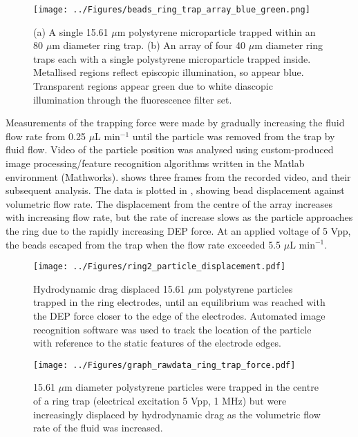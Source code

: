 \begin{figure}
 \centering
 \texttt{[image: ../Figures/beads\_ring\_trap\_array\_blue\_green.png]}
 \caption[Trapping single 15.61 $\mu$m polystyrene microparticles in the ring electrodes.]{(a) A single 15.61 $\mu$m polystyrene microparticle trapped within an 80 $\mu$m diameter ring trap. (b) An array of four 40 $\mu$m diameter ring traps each with a single polystyrene microparticle trapped inside. Metallised regions reflect episcopic illumination, so appear blue. Transparent regions appear green due to white diascopic illumination through the fluorescence filter set.}
 \label{fig:beads_ring_trap_array_blue_green}
\end{figure}

Measurements of the trapping force were made by gradually increasing the fluid flow rate from 0.25 $\mu$L min$^{-1}$ until the particle was removed from the trap by fluid flow. Video of the particle position was analysed using custom-produced image processing/feature recognition algorithms written in the Matlab environment (Mathworks).  shows three frames from the recorded video, and their subsequent analysis. The data is plotted in , showing bead displacement against volumetric flow rate. The displacement from the centre of the array increases with increasing flow rate, but the rate of increase slows as the particle approaches the ring due to the rapidly increasing DEP force. At an applied voltage of 5 Vpp, the beads escaped from the trap when the flow rate exceeded 5.5 $\mu$L min$^{-1}$.

\begin{figure}
 \centering
 \texttt{[image: ../Figures/ring2\_particle\_displacement.pdf]}
 \caption[A single 15.61 $\mu$m polystyrene particle trapped in the ring electrodes is displaced by hydrodynamic drag.]{Hydrodynamic drag displaced 15.61 $\mu$m polystyrene particles trapped in the ring electrodes, until an equilibrium was reached with the DEP force closer to the edge of the electrodes. Automated image recognition software was used to track the location of the particle with reference to the static features of the electrode edges.}
 \label{fig:ring2_particle_displacement}
\end{figure}

\begin{figure}
	\centering
		\texttt{[image: ../Figures/graph\_rawdata\_ring\_trap\_force.pdf]}
	\caption[Plot of the displacement of single 15.61 $\mu$m polystyrene particles by hydrodynamic drag while trapped in the ring electrodes.]{15.61 $\mu$m diameter polystyrene particles were trapped in the centre of a ring trap (electrical excitation 5 Vpp, 1 MHz) but were increasingly displaced by hydrodynamic drag as the volumetric flow rate of the fluid was increased.}
	\label{fig:graph_rawdata_ring_trap_force}
\end{figure}

